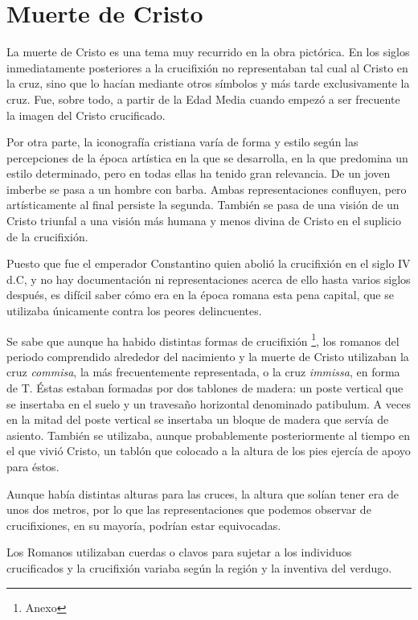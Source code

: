 \section{Muerte de Cristo}
La muerte de Cristo es una tema muy recurrido en la obra pictórica. En los siglos inmediatamente posteriores a la crucifixión no representaban tal cual al Cristo en la cruz, sino que lo hacían mediante otros símbolos y más tarde exclusivamente la cruz. Fue, sobre todo, a partir de la Edad Media cuando empezó a ser frecuente la imagen del Cristo crucificado.

Por otra parte, la iconografía cristiana varía de forma y estilo según las percepciones de la época artística en la que se desarrolla, en la que predomina un estilo determinado, pero en todas ellas ha tenido gran relevancia. De un joven imberbe se pasa a un hombre con barba. Ambas representaciones confluyen, pero artísticamente al final persiste la segunda. También se pasa de una visión de un Cristo triunfal a una visión más humana y menos divina de Cristo en el suplicio de la crucifixión.

Puesto que fue el emperador Constantino quien abolió la crucifixión en el siglo IV d.C, y no hay documentación ni representaciones acerca de ello hasta varios siglos después, es difícil saber cómo era en la época romana esta pena capital, que se utilizaba únicamente contra los peores delincuentes.

Se sabe que aunque ha habido distintas formas de crucifixión \footnote{Anexo}, los romanos del periodo comprendido alrededor del nacimiento y la muerte de Cristo utilizaban la cruz \textit{commisa}, la más frecuentemente representada, o la cruz \textit{immissa}, en forma de T. Éstas estaban formadas por dos tablones de madera: un poste vertical que se insertaba en el suelo y un travesaño horizontal denominado patibulum. A veces en la mitad del poste vertical se insertaba un bloque de madera que servía de asiento. También se utilizaba, aunque probablemente posteriormente al tiempo en el que vivió Cristo, un tablón que colocado a la altura de los pies ejercía de apoyo para éstos.

Aunque había distintas alturas para las cruces, la altura que solían tener era de unos dos metros, por lo que las representaciones que podemos observar de crucifixiones, en su mayoría, podrían estar equivocadas.

Los Romanos utilizaban cuerdas o clavos para sujetar a los individuos crucificados y la crucifixión variaba según la región y la inventiva del verdugo.


